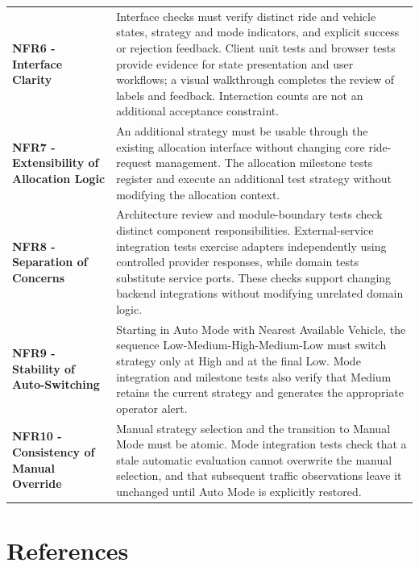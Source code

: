 \documentclass[11pt,a4paper,oneside]{report}
\begin{document}
\begin{longtable}{@{}
    >{\raggedright\arraybackslash}p{}
    >{\raggedright\arraybackslash}p{}
@{}}
\textbf{NFR6 - Interface Clarity}
&
Interface checks must verify distinct ride and vehicle states,
strategy and mode indicators, and explicit success or rejection
feedback. Client unit tests and browser tests provide evidence for
state presentation and user workflows; a visual walkthrough completes
the review of labels and feedback. Interaction counts are not an
additional acceptance constraint.
\\

\textbf{NFR7 - Extensibility of Allocation Logic}
&
An additional strategy must be usable through the existing allocation
interface without changing core ride-request management.
The allocation milestone tests register and execute an additional
test strategy without modifying the allocation context.
\\

\textbf{NFR8 - Separation of Concerns}
&
Architecture review and module-boundary tests check distinct component
responsibilities. External-service integration tests exercise adapters
independently using controlled provider responses, while domain tests
substitute service ports. These checks support changing backend
integrations without modifying unrelated domain logic.
\\

\textbf{NFR9 - Stability of Auto-Switching}
&
Starting in Auto Mode with Nearest Available Vehicle, the sequence
Low-Medium-High-Medium-Low must switch strategy only at High and
at the final Low. Mode integration and milestone tests also verify
that Medium retains the current strategy and generates the appropriate
operator alert.
\\

\textbf{NFR10 - Consistency of Manual Override}
&
Manual strategy selection and the transition to Manual Mode must be
atomic. Mode integration tests check that a stale automatic evaluation
cannot overwrite the manual selection, and that subsequent traffic
observations leave it unchanged until Auto Mode is explicitly restored.
\\

\end{longtable}
\endgroup

\hypertarget{references}{%
\chapter{References}\label{references}}
\end{document}
